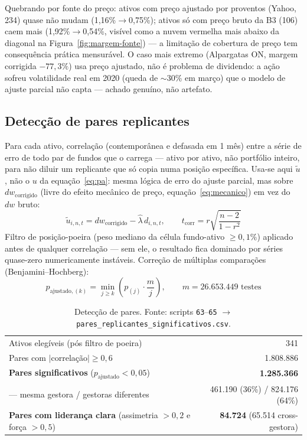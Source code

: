 \documentclass[11pt,a4paper]{article}
\begin{document}
Quebrando por fonte do preço: ativos com preço ajustado por proventos (Yahoo, 234) quase não
mudam (1,16\%$\to$0,75\%); ativos só com preço bruto da B3 (106) caem mais
(1,92\%$\to$0,54\%, visível como a nuvem vermelha mais abaixo da diagonal na
Figura~\ref{fig:margem-fonte}) --- a limitação de cobertura de preço tem consequência prática
mensurável. O caso mais extremo (Alpargatas ON, margem corrigida $-77,3\%$) usa preço ajustado,
não é problema de dividendo: a ação sofreu volatilidade real em 2020 (queda de $\sim$30\% em
março) que o modelo de ajuste parcial não capta --- achado genuíno, não artefato.

\FloatBarrier
\subsection{Detecção de pares replicantes}

Para cada ativo, correlação (contemporânea e defasada em 1 mês) entre a série de erro de todo
par de fundos que o carrega --- ativo por ativo, não portfólio inteiro, para não diluir um
replicante que só copia numa posição específica. Usa-se aqui $\tilde u$, não o $u$ da
equação~\eqref{eq:pa}: mesma lógica de erro do ajuste parcial, mas sobre $dw_{\text{corrigido}}$
(livre do efeito mecânico de preço, equação~\eqref{eq:mecanico}) em vez do $dw$ bruto:
\begin{equation}
\tilde u_{i,n,t} = dw_{\text{corrigido}} - \widehat\lambda\, d_{i,n,t}, \qquad
t_{\text{corr}} = r\sqrt{\frac{n-2}{1-r^2}}
\label{eq:corr-pares}
\end{equation}
Filtro de posição-poeira (peso mediano da célula fundo-ativo $\geq0{,}1\%$) aplicado antes de
qualquer correlação --- sem ele, o resultado fica dominado por séries quase-zero numericamente
instáveis. Correção de múltiplas comparações (Benjamini--Hochberg):
\begin{equation}
p_{\text{ajustado},(k)} = \min_{j\geq k}\left(p_{(j)}\cdot\frac{m}{j}\right), \qquad
m = 26.653.449 \text{ testes}
\label{eq:bh}
\end{equation}

\begin{table}[h]\centering\small
\caption{Detecção de pares. Fonte: scripts \texttt{63}--\texttt{65} $\to$
\texttt{pares\_replicantes\_significativos.csv}.}
\label{tab:pares}
\begin{tabular}{@{}lr@{}}
\toprule
Ativos elegíveis (pós filtro de poeira) & 341 \\
Pares com $|$correlação$|\geq0{,}6$ & 1.808.886 \\
\textbf{Pares significativos} ($p_{\text{ajustado}}<0{,}05$) & \textbf{1.285.366} \\
\quad --- mesma gestora / gestoras diferentes & 461.190 (36\%) / 824.176 (64\%) \\
\textbf{Pares com liderança clara} (assimetria $>0{,}2$ e força $>0{,}5$) & \textbf{84.724} (65.514 cross-gestora) \\
\bottomrule
\end{tabular}
\end{table}
\end{document}

